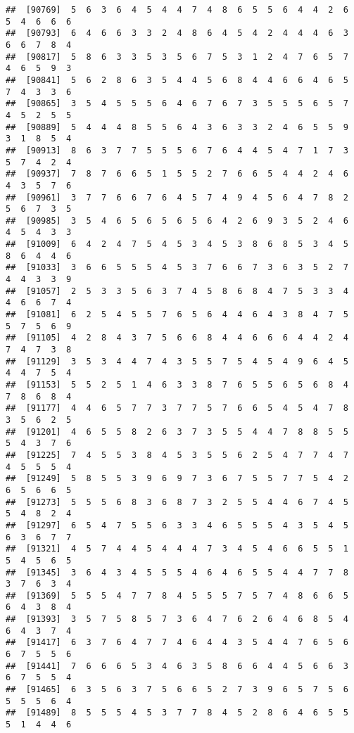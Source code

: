 \documentclass[
]{book}
\begin{document}
\begin{verbatim}
##  [90769]  5  6  3  6  4  5  4  4  7  4  8  6  5  5  6  4  4  2  6  5  4  6  6  6
##  [90793]  6  4  6  6  3  3  2  4  8  6  4  5  4  2  4  4  4  6  3  6  6  7  8  4
##  [90817]  5  8  6  3  3  5  3  5  6  7  5  3  1  2  4  7  6  5  7  4  6  5  9  3
##  [90841]  5  6  2  8  6  3  5  4  4  5  6  8  4  4  6  6  4  6  5  7  4  3  3  6
##  [90865]  3  5  4  5  5  5  6  4  6  7  6  7  3  5  5  5  6  5  7  4  5  2  5  5
##  [90889]  5  4  4  4  8  5  5  6  4  3  6  3  3  2  4  6  5  5  9  3  1  8  5  4
##  [90913]  8  6  3  7  7  5  5  5  6  7  6  4  4  5  4  7  1  7  3  5  7  4  2  4
##  [90937]  7  8  7  6  6  5  1  5  5  2  7  6  6  5  4  4  2  4  6  4  3  5  7  6
##  [90961]  3  7  7  6  6  7  6  4  5  7  4  9  4  5  6  4  7  8  2  5  6  7  3  5
##  [90985]  3  5  4  6  5  6  5  6  5  6  4  2  6  9  3  5  2  4  6  4  5  4  3  3
##  [91009]  6  4  2  4  7  5  4  5  3  4  5  3  8  6  8  5  3  4  5  8  6  4  4  6
##  [91033]  3  6  6  5  5  5  4  5  3  7  6  6  7  3  6  3  5  2  7  4  4  3  3  9
##  [91057]  2  5  3  3  5  6  3  7  4  5  8  6  8  4  7  5  3  3  4  4  6  6  7  4
##  [91081]  6  2  5  4  5  5  7  6  5  6  4  4  6  4  3  8  4  7  5  5  7  5  6  9
##  [91105]  4  2  8  4  3  7  5  6  6  8  4  4  6  6  6  4  4  2  4  7  4  7  3  8
##  [91129]  3  5  3  4  4  7  4  3  5  5  7  5  4  5  4  9  6  4  5  4  4  7  5  4
##  [91153]  5  5  2  5  1  4  6  3  3  8  7  6  5  5  6  5  6  8  4  7  8  6  8  4
##  [91177]  4  4  6  5  7  7  3  7  7  5  7  6  6  5  4  5  4  7  8  3  5  6  2  5
##  [91201]  4  6  5  5  8  2  6  3  7  3  5  5  4  4  7  8  8  5  5  5  4  3  7  6
##  [91225]  7  4  5  5  3  8  4  5  3  5  5  6  2  5  4  7  7  4  7  4  5  5  5  4
##  [91249]  5  8  5  5  3  9  6  9  7  3  6  7  5  5  7  7  5  4  2  6  5  6  6  5
##  [91273]  5  5  5  6  8  3  6  8  7  3  2  5  5  4  4  6  7  4  5  5  4  8  2  4
##  [91297]  6  5  4  7  5  5  6  3  3  4  6  5  5  5  4  3  5  4  5  6  3  6  7  7
##  [91321]  4  5  7  4  4  5  4  4  4  7  3  4  5  4  6  6  5  5  1  5  4  5  6  5
##  [91345]  3  6  4  3  4  5  5  5  4  6  4  6  5  5  4  4  7  7  8  3  7  6  3  4
##  [91369]  5  5  5  4  7  7  8  4  5  5  5  7  5  7  4  8  6  6  5  6  4  3  8  4
##  [91393]  3  5  7  5  8  5  7  3  6  4  7  6  2  6  4  6  8  5  4  6  4  3  7  4
##  [91417]  6  3  7  6  4  7  7  4  6  4  4  3  5  4  4  7  6  5  6  6  7  5  5  6
##  [91441]  7  6  6  6  5  3  4  6  3  5  8  6  6  4  4  5  6  6  3  6  7  5  5  4
##  [91465]  6  3  5  6  3  7  5  6  6  5  2  7  3  9  6  5  7  5  6  5  5  5  6  4
##  [91489]  8  5  5  5  4  5  3  7  7  8  4  5  2  8  6  4  6  5  5  5  1  4  4  6

\end{verbatim}
\end{document}
